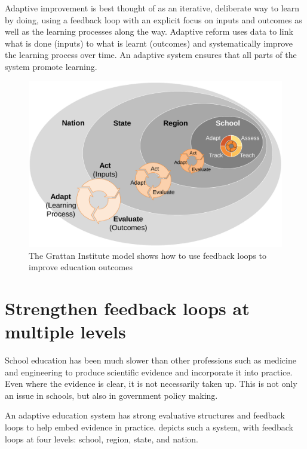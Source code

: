 Adaptive improvement is best thought of as an iterative, deliberate way to learn by doing, using a feedback loop with an explicit focus on inputs and outcomes as well as the learning processes along the way. Adaptive reform uses data to link what is done (inputs) to what is learnt (outcomes) and systematically improve the learning process over time. An adaptive system ensures that all parts of the system promote learning.


\begin{figure}
\caption{The Grattan Institute model shows how to use feedback loops to improve education outcomes\label{fig:Grattan-Institute-Model}}
\includegraphics[page=1]{charts/GonskiReportCharts.pdf}
\end{figure}



\section{Strengthen feedback loops at multiple levels}\label{sec:Strengthen-feedback-loops-at-multiple-levels}

School education has been much slower than other professions such as medicine and engineering to produce scientific evidence and incorporate it into practice. Even where the evidence is clear, it is not necessarily taken up. This is not only an issue in schools, but also in government policy making.  

An adaptive education system has strong evaluative structures and feedback loops to help embed evidence in practice.  depicts such a system, with feedback loops at four levels: school, region, state, and nation. 

